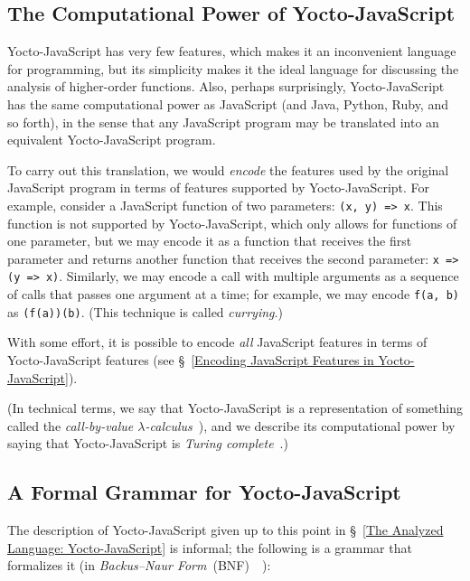 \documentclass[12pt, oneside]{book}
\begin{document}
\subsection{The Computational Power of Yocto-JavaScript}

Yocto-JavaScript has very few features, which makes it an inconvenient language for programming, but its simplicity makes it the ideal language for discussing the analysis of higher-order functions. Also, perhaps surprisingly, Yocto-JavaScript has the same computational power as JavaScript (and Java, Python, Ruby, and so forth), in the sense that any JavaScript program may be translated into an equivalent Yocto-JavaScript program.

To carry out this translation, we would \emph{encode} the features used by the original JavaScript program in terms of features supported by Yocto-JavaScript. For example, consider a JavaScript function of two parameters: \texttt{(x, y) => x}. This function is not supported by Yocto-JavaScript, which only allows for functions of one parameter, but we may encode it as a function that receives the first parameter and returns another function that receives the second parameter: \texttt{x => (y => x)}. Similarly, we may encode a call with multiple arguments as a sequence of calls that passes one argument at a time; for example, we may encode \texttt{f(a, b)} as \texttt{(f(a))(b)}. (This technique is called \emph{currying}.)

With some effort, it is possible to encode \emph{all} JavaScript features in terms of Yocto-JavaScript features (see §~\ref{Encoding JavaScript Features in Yocto-JavaScript}).

(In technical terms, we say that Yocto-JavaScript is a representation of something called the \emph{call-by-value $\lambda$-calculus}~\cite[§~6]{understanding-computation}), and we describe its computational power by saying that Yocto-JavaScript is \emph{Turing complete}~\cite[§~7]{understanding-computation}.)

\subsection{A Formal Grammar for Yocto-JavaScript}
\label{A Formal Grammar for Yocto-JavaScript}

The description of Yocto-JavaScript given up to this point in §~\ref{The Analyzed Language: Yocto-JavaScript} is informal; the following is a grammar that formalizes it (in \emph{Backus–Naur Form}~(BNF)~\cite{bnf}~\cite[§~4.2]{dragon-book}):
\end{document}
